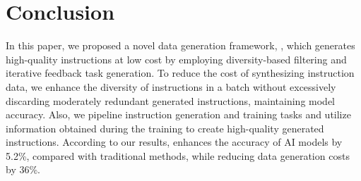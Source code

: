 \section{Conclusion}
\label{sec:conc}

In this paper, we proposed a novel data generation framework, \ours{}, which generates high-quality instructions at low cost by employing diversity-based filtering and iterative feedback task generation. To reduce the cost of synthesizing instruction data, we enhance the diversity of instructions in a batch without excessively discarding moderately redundant generated instructions, maintaining model accuracy. Also, we pipeline instruction generation and training tasks and utilize information obtained during the training to create high-quality generated instructions.  According to our results, \ours{} enhances the accuracy of AI models by 5.2\%, compared with traditional methods, while reducing data generation costs by 36\%.
